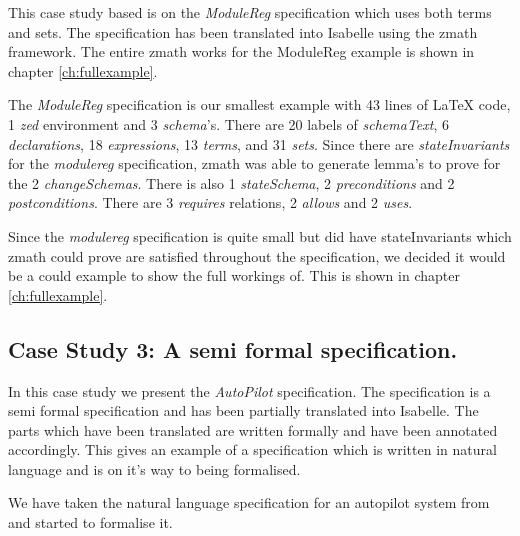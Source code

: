This case study based is on the \emph{ModuleReg} specification which uses both
terms and sets. The specification has been translated into Isabelle using the
\gls{zmath} framework. The entire \gls{zmath} works for the ModuleReg example is
shown in chapter \ref{ch:fullexample}.

The \emph{ModuleReg} specification is our smallest example with 43 lines of
\LaTeX{} code, 1 \emph{zed} environment and 3 \emph{schema}'s. There are 20
labels of \emph{schemaText}, 6 \emph{declarations}, 18 \emph{expressions}, 13
\emph{terms}, and 31 \emph{sets}. Since there are \emph{stateInvariants} for the
\emph{modulereg} specification, \gls{zmath} was able to generate lemma's to
prove for the 2 \emph{changeSchemas}. There is also 1 \emph{stateSchema}, 2
\emph{preconditions} and 2 \emph{postconditions}. There are 3 \emph{requires}
relations, 2 \emph{allows} and 2 \emph{uses}.

Since the \emph{modulereg} specification is quite small but did have
stateInvariants which \gls{zmath} could prove are satisfied throughout the
specification, we decided it would be a could example to show the full workings
of. This is shown in chapter \ref{ch:fullexample}.

\subsection{Case Study 3: A semi formal specification.}

In this case study we present the \emph{AutoPilot} specification. The
specification is a semi formal specification and has been partially translated
into Isabelle. The parts which have been translated are written formally and
have been annotated accordingly. This gives an example of a specification which
is written in natural language and is on it's way to being formalised.

We have taken the natural language specification for an autopilot system from
\cite{Butler96} and started to formalise it.

